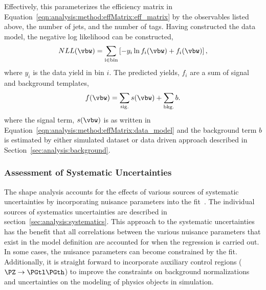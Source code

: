 Effectively, this parameterizes the efficiency matrix in Equation~\ref{eqn:analysis:method:effMatrix:eff_matrix} by the observables listed above, the number of jets, and the number of \PQb tags.  Having constructed the data model, the negative log likelihood can be constructed,
\begin{equation}
\label{eqn:analysis:method:mel_nll}
    NLL(\vbw) = \sum_{\mathrm{i\in bin}} \left[ - y_{i}\ln f_{i}(\vbw) + f_{i}(\vbw) \right],
\end{equation}
\noindent where $y_{i}$ is the data yield in bin $i$.  The predicted yields, $f_{i}$ are a sum of signal and background templates, 
\begin{equation}
    f(\vbw) = \sum_{\rm sig.}s(\vbw) + \sum_{\rm bkg.} b.
\end{equation}
\noindent where the signal term, $s(\vbw)$ is as written in Equation~\ref{eqn:analysis:method:effMatrix:data_model} and the background term $b$ is estimated by either simulated dataset or data driven approach described in Section~\ref{sec:analysis:background}.



\subsubsection{Assessment of Systematic Uncertainties}
\label{sec:analysis:shape_syst}

The shape analysis accounts for the effects of various sources of systematic uncertainties by incorporating nuisance parameters into the fit~\cite{Conway:2011in}.  The individual sources of systematics uncertainties are described in section~\ref{sec:analysis:systematics}.  This approach to the systematic uncertainties has the benefit that all correlations between the various nuisance parameters that exist in the model definition are accounted for when the regression is carried out.  In some cases, the nuisance parameters can become constrained by the fit.  Additionally, it is straight forward to incorporate auxiliary control regions ($\PZ\to\PGtl\PGth$) to improve the constraints on background normalizations and uncertainties on the modeling of physics objects in simulation.


